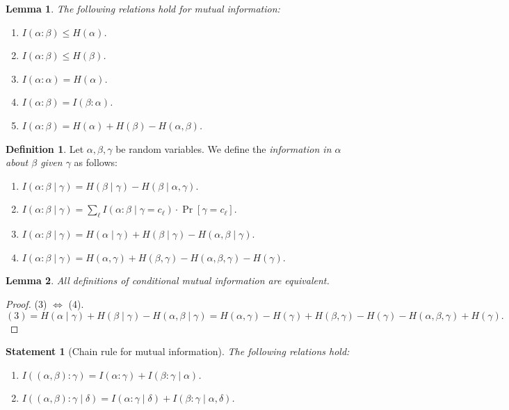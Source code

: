 \documentclass[12pt,sans]{article}
\theoremstyle{definition}
\newtheorem{definition}{Definition}[section]
\theoremstyle{plain}
\newtheorem{lemma}{Lemma}[section]
\newtheorem{statement}{Statement}[section]
\theoremstyle{remark}
\begin{document}
\begin{lemma}
    The following relations hold for mutual information:
    \begin{enumerate}
        \item \(I(\alpha:\beta) \le H(\alpha)\).
        \item \(I(\alpha:\beta) \le H(\beta)\).
        \item \(I(\alpha:\alpha) = H(\alpha)\).
        \item \(I(\alpha:\beta) = I(\beta:\alpha)\).
        \item \(I(\alpha:\beta) = H(\alpha) + H(\beta) - H(\alpha,\beta)\).
    \end{enumerate}
\end{lemma}

\begin{definition}
    Let \(\alpha, \beta, \gamma\) be random variables. We define the \emph{information in \(\alpha\) about \(\beta\) given \(\gamma\)} as follows:
    \begin{enumerate}
        \item \(I(\alpha:\beta\mid\gamma) = H(\beta\mid\gamma) - H(\beta\mid\alpha,\gamma)\).
        \item \(I(\alpha:\beta\mid\gamma) = \sum_\ell I(\alpha:\beta \mid \gamma = c_\ell) \cdot \Pr[\gamma = c_\ell]\).
        \item \(I(\alpha:\beta\mid\gamma) = H(\alpha\mid\gamma) + H(\beta\mid\gamma) - H(\alpha,\beta\mid\gamma)\).
        \item \(I(\alpha:\beta\mid\gamma) = H(\alpha,\gamma) + H(\beta,\gamma) - H(\alpha,\beta,\gamma) - H(\gamma)\).
    \end{enumerate}
\end{definition}

\begin{lemma}
    All definitions of conditional mutual information are equivalent.
\end{lemma}

\begin{proof}
    (3) \(\iff\) (4).
    \[
    (3) = H(\alpha\mid\gamma) + H(\beta\mid\gamma) - H(\alpha,\beta\mid\gamma) =
    H(\alpha,\gamma) - H(\gamma) + H(\beta,\gamma) - H(\gamma) -
    H(\alpha,\beta,\gamma) + H(\gamma).
    \]
\end{proof}

\begin{statement}[Chain rule for mutual information]
    The following relations hold:
    \begin{enumerate}
        \item \(I((\alpha,\beta) : \gamma) = I(\alpha : \gamma) + I(\beta: \gamma \mid \alpha)\).
        \item \(I((\alpha,\beta) : \gamma \mid \delta) = I(\alpha : \gamma \mid \delta) + I(\beta: \gamma \mid \alpha, \delta)\).
    \end{enumerate}
\end{statement}
\end{document}
